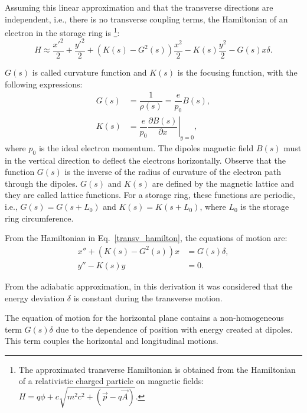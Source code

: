 Assuming this linear approximation and that the transverse directions are independent, i.e., there is no transverse coupling terms, the Hamiltonian of an electron in the storage ring is \footnote{The approximated transverse Hamiltonian is obtained from the Hamiltonian of a relativistic charged particle on magnetic fields: $H = q\phi + c\sqrt{m^2c^2 + \left(\vec{p} - q\vec{A}\right) }$.}:
\begin{equation}
    H \approx \dfrac{{x'}^2}{2} + \dfrac{{y'}^2}{2} + \left(K(s)- G^{2}(s)\right)\dfrac{{x}^2}{2} - K(s) \frac{y^2}{2} - G(s) x \delta.
    \label{transv_hamilton}
\end{equation}

$G(s)$ is called curvature function and $K(s)$ is the focusing function, with the following expressions:
\begin{align}
    G(s) &= \dfrac{1}{\rho(s)} = \dfrac{e}{p_0}B(s), \\
    K(s) &= \dfrac{e}{p_0}\left.\dfrac{\partial B(s)}{\partial x}\right|_{y=0},
\end{align}
where $p_0$ is the ideal electron momentum. The dipoles magnetic field $B(s)$ must in the vertical direction to deflect the electrons horizontally. Observe that the function $G(s)$ is the inverse of the radius of curvature of the electron path through the dipoles. $G(s)$ and $K(s)$ are defined by the magnetic lattice and they are called lattice functions. For a storage ring, these functions are periodic, i.e., $G(s) = G(s+L_0)$ and $K(s) = K(s+L_0)$, where $L_0$ is the storage ring circumference.


From the Hamiltonian in Eq.~\eqref{transv_hamilton}, the equations of motion are:
\begin{align}
    x'' + \left(K(s) - G^{2}(s)\right)x &= G(s) \delta, \\
    y'' - K(s)y &= 0.
\end{align}

From the adiabatic approximation, in this derivation it was considered that the energy deviation $\delta$ is constant during the transverse motion.

The equation of motion for the horizontal plane contains a non-homogeneous term $G(s)\delta$ due to the dependence of position with energy created at dipoles. This term couples the horizontal and longitudinal motions.


